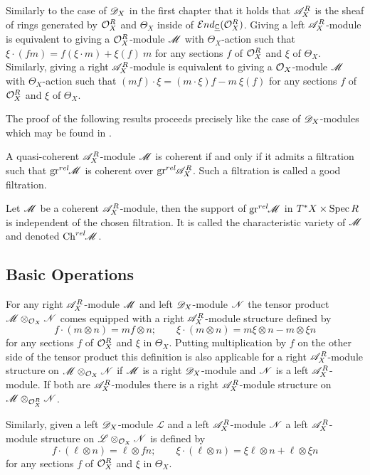 Similarly to the case of $\mathscr{D}_X$ in the first chapter that  it holds that $\mathscr{A}_X^R$ is the sheaf of rings generated by $\mathcal{O}_X^R$ and $\Theta_X$ inside of $\mathcal{E}nd_{\underline{\mathbb{C}}}(\mathcal{O}_X^R)$. Giving a left $\mathscr{A}_X^R$-module is equivalent to giving a $\mathcal{O}_X^R$-module $\mathscr{M}$ with $\Theta_X$-action such that
$\xi\cdot (fm) = f (\xi \cdot m)  + \xi(f)\ m  $
for any sections $f$ of $\mathcal{O}_X^R$ and $\xi$ of $\Theta_X$. Similarly, giving a right $\mathscr{A}_X^R$-module is equivalent to giving a $\mathcal{O}_X$-module $\mathscr{M}$ with $\Theta_X$-action such that $(mf)\cdot\xi = (m\cdot\xi)f - m\ \xi(f) $ for any sections $f$ of $\mathcal{O}_X^R$ and $\xi$ of $\Theta_X$.

The proof of the following results proceeds precisely like the case of $\mathscr{D}_X$-modules which may be found in \cite[Chapter 2]{hotta2007d}. 
\begin{proposition}\label{prop: CoherentAndGoodFiltration}
    A quasi-coherent $\mathscr{A}_X^R$-module $\mathscr{M}$ is coherent if and only if it admits a filtration such that $\operatorname{gr}^{rel}\mkern-5mu \mathscr{M}$ is coherent over $\operatorname{gr}^{rel}\mkern-5mu \mathscr{A}_X^R$. Such a filtration is called a good filtration.
\end{proposition}
\begin{proposition}
    Let $\mathscr{M}$ be a coherent $\mathscr{A}_X^R$-module, then the support of $\operatorname{gr}^{rel}\mkern-5mu \mathscr{M}$ in $T^*X \times \operatorname{Spec} R$ is independent of the chosen filtration. It is called the characteristic variety of $\mathscr{M}$ and denoted $\operatorname{Ch}^{rel}\mkern-5mu \mathscr{M}$.
\end{proposition}
\subsection{Basic Operations}\label{sec: BasicOperations}
For any right $\mathscr{A}_{X}^R$-module $\mathscr{M}$ and left $\mathscr{D}_X$-module $\mathscr{N}$ the tensor product $\mathscr{M} \otimes_{\mathcal{O}_X} \mathscr{N}$ comes equipped with a right $\mathscr{A}_X^R$-module structure defined by
$$f\cdot (m\otimes n) = mf \otimes n; \qquad \xi \cdot (m\otimes n) = m\xi \otimes n - m\otimes \xi n $$
for any sections $f$ of $\mathcal{O}_X^R$ and $\xi$ in $\Theta_X$. Putting multiplication by $f$ on the other side of the tensor product this definition is also applicable for a right $\mathscr{A}_X^R$-module structure on $\mathscr{M}\otimes_{\mathcal{O}_X} \mathscr{N}$ if $\mathscr{M}$ is a right $\mathscr{D}_X$-module and $\mathscr{N}$ is a left $\mathscr{A}_X^R$-module. If both are $\mathscr{A}_X^R$-modules there is a right $\mathscr{A}_X^R$-module structure on $\mathscr{M}\otimes_{\mathcal{O}_X^R} \mathscr{N}$.

Similarly, given a left $\mathscr{D}_X$-module $\mathscr{L}$ and a left $\mathscr{A}_X^R$-module $\mathscr{N}$ a left $\mathscr{A}_X^R$-module structure on $\mathscr{L} \otimes_{\mathcal{O}_X} \mathscr{N}$ is defined by
$$f \cdot (\ell\otimes n) =\ell \otimes fn; \qquad \xi \cdot (\ell\otimes n ) = \xi \ell \otimes n + \ell \otimes \xi n$$
for any sections $f$ of $\mathcal{O}_X^R$ and $\xi$ in $\Theta_X$.

